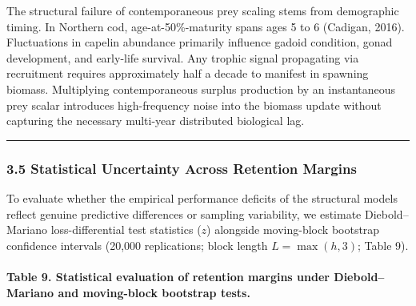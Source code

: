 \documentclass[11pt]{article}
\begin{document}
The structural failure of contemporaneous prey scaling stems from
demographic timing. In Northern cod, age-at-50\%-maturity spans ages 5
to 6 (Cadigan, 2016). Fluctuations in capelin abundance primarily
influence gadoid condition, gonad development, and early-life survival.
Any trophic signal propagating via recruitment requires approximately
half a decade to manifest in spawning biomass. Multiplying
contemporaneous surplus production by an instantaneous prey scalar
introduces high-frequency noise into the biomass update without
capturing the necessary multi-year distributed biological lag.

\begin{center}\rule{0.5\linewidth}{0.5pt}\end{center}

\subsubsection{3.5 Statistical Uncertainty Across Retention
Margins}\label{statistical-uncertainty-across-retention-margins}

To evaluate whether the empirical performance deficits of the structural
models reflect genuine predictive differences or sampling variability,
we estimate Diebold--Mariano loss-differential test statistics (\(z\))
alongside moving-block bootstrap confidence intervals (20,000
replications; block length \(L = \max(h, 3)\); Table 9).

\paragraph{Table 9. Statistical evaluation of retention margins under
Diebold--Mariano and moving-block bootstrap
tests.}\label{table-9.-statistical-evaluation-of-retention-margins-under-dieboldmariano-and-moving-block-bootstrap-tests.}
\end{document}
